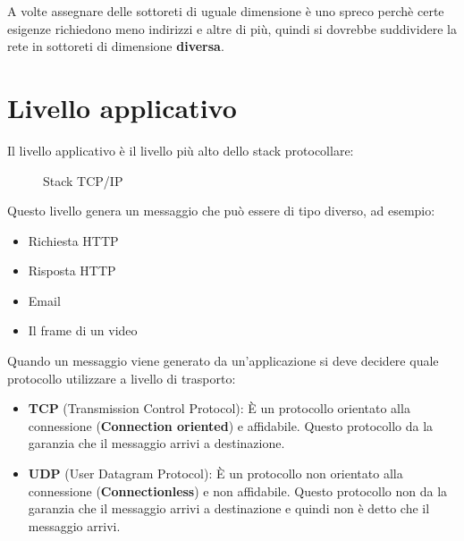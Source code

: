 \documentclass[a4paper]{article}
\begin{document}
\vspace{1em}
\noindent
A volte assegnare delle sottoreti di uguale dimensione è uno spreco perchè certe esigenze
richiedono meno indirizzi e altre di più, quindi si dovrebbe suddividere la rete in sottoreti 
di dimensione \textbf{diversa}.

\section{Livello applicativo}
Il livello applicativo è il livello più alto dello stack protocollare:
\begin{figure}[H]
  \centering
  \caption{Stack TCP/IP}
\end{figure}

\noindent
Questo livello genera un messaggio che può essere di tipo diverso, ad esempio:
\begin{itemize}
  \item Richiesta HTTP
  \item Risposta HTTP
  \item Email
  \item Il frame di un video
\end{itemize}
Quando un messaggio viene generato da un'applicazione si deve decidere quale protocollo
utilizzare a livello di trasporto:
\begin{itemize}
  \item \textbf{TCP} (Transmission Control Protocol): È un protocollo orientato
    alla connessione (\textbf{Connection oriented}) e affidabile. Questo protocollo da
    la garanzia che il messaggio arrivi a destinazione.
  \item \textbf{UDP} (User Datagram Protocol): È un protocollo non orientato alla
    connessione (\textbf{Connectionless}) e non affidabile. Questo protocollo non da la
    garanzia che il messaggio arrivi a destinazione e quindi non è detto che il messaggio
    arrivi.
\end{itemize}
\end{document}
